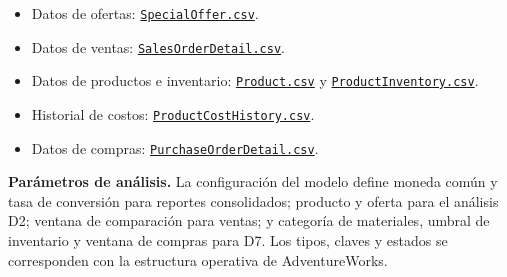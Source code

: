 \documentclass[10pt,a4paper]{article}
\begin{document}
\begin{itemize}
  \item Datos de ofertas:
  \href{https://raw.githubusercontent.com/microsoft/sql-server-samples/master/samples/databases/adventure-works/oltp-install-script/SpecialOffer.csv}{\texttt{SpecialOffer.csv}}.
  \item Datos de ventas:
  \href{https://raw.githubusercontent.com/microsoft/sql-server-samples/master/samples/databases/adventure-works/oltp-install-script/SalesOrderDetail.csv}{\texttt{SalesOrderDetail.csv}}.
  \item Datos de productos e inventario:
  \href{https://raw.githubusercontent.com/microsoft/sql-server-samples/master/samples/databases/adventure-works/oltp-install-script/Product.csv}{\texttt{Product.csv}} y
  \href{https://raw.githubusercontent.com/microsoft/sql-server-samples/master/samples/databases/adventure-works/oltp-install-script/ProductInventory.csv}{\texttt{ProductInventory.csv}}.
  \item Historial de costos:
  \href{https://raw.githubusercontent.com/microsoft/sql-server-samples/master/samples/databases/adventure-works/oltp-install-script/ProductCostHistory.csv}{\texttt{ProductCostHistory.csv}}.
  \item Datos de compras:
  \href{https://raw.githubusercontent.com/microsoft/sql-server-samples/master/samples/databases/adventure-works/oltp-install-script/PurchaseOrderDetail.csv}{\texttt{PurchaseOrderDetail.csv}}.
\end{itemize}

\textbf{Parámetros de análisis.} La configuración del modelo define moneda
común y tasa de conversión para reportes consolidados; producto y oferta para
el análisis D2; ventana de comparación para ventas; y categoría de materiales,
umbral de inventario y ventana de compras para D7. Los tipos, claves y estados
se corresponden con la estructura operativa de AdventureWorks.
\end{document}
